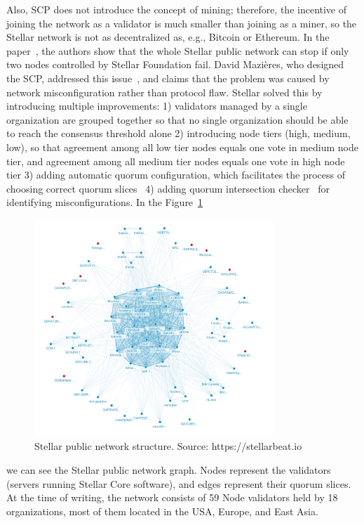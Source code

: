 \documentclass[applsci,article,submit,moreauthors,pdftex]{Definitions/mdpi}
\begin{document}
Also, SCP does not introduce the concept of mining; therefore, the incentive of joining the network as a validator is much smaller than joining as a miner, so the Stellar network is not as decentralized as, e.g., Bitcoin or Ethereum. In the paper~\cite{kim2019Stellar}, the authors show that the whole Stellar public network can stop if only two nodes controlled by Stellar Foundation fail. David Mazières, who designed the SCP, addressed this issue~\cite{Safetyvs90:online}, and claims that the problem was caused by network misconfiguration rather than protocol flaw. Stellar solved this by introducing multiple improvements: 1) validators managed by a single organization are grouped together so that no single organization should be able to reach the consensus threshold alone 2) introducing node tiers (high, medium, low), so that agreement among all low tier nodes equals one vote in medium node tier, and agreement among all medium tier nodes equals one vote in high node tier 3) adding automatic quorum configuration, which facilitates the process of choosing correct quorum slices~\cite{WhyQuoru96:online} 4) adding quorum intersection checker~\cite{DBLP:journals/corr/abs-1902-06493} for identifying misconfigurations. In the Figure~\ref{fig:network-viz} 
\begin{figure}[h!]
\includegraphics[width=9cm]{figs/Stellar-network-viz.png}
\centering
\caption{Stellar public network structure. Source: https://stellarbeat.io}
\label{fig:network-viz}
\end{figure} 
we can see the Stellar public network graph. Nodes represent the validators (servers running Stellar Core software), and edges represent their quorum slices. At the time of writing, the network consists of 59 Node validators held by 18 organizations, most of them located in the USA, Europe, and East Asia.
\end{document}
